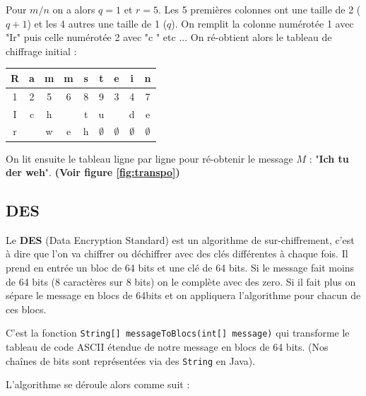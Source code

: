 \documentclass{article}
\begin{document}
\begin{itemize}
Pour $m/n$ on a alors $q=1$ et $r = 5$. Les 5 premières colonnes ont une taille de 2 ($q+1$) et les 4 autres une taille de 1 ($q$). On remplit la colonne numérotée 1 avec "Ir" puis celle numérotée 2 avec "c " etc ...  On ré-obtient alors le tableau de chiffrage initial :
\vspace{1\baselineskip}

\begin{center}
\begin{tabular}{|c|c|c|c|c|c|c|c|c|}
\hline
R & a & m & m & s & t & e & i & n\\
\hline
1 & 2 & 5 & 6 & 8 & 9 & 3 & 4 & 7\\
\hline
I & c & h &  & t & u &  & d & e\\
\hline
r &  & w & e & h & $\emptyset$ & $\emptyset$ & $\emptyset$ & $\emptyset$\\
\hline
\end{tabular}
\end{center}
\vspace{1\baselineskip}

On lit ensuite le tableau ligne par ligne pour ré-obtenir le message $M$ : "\textbf{Ich tu der weh}". \textbf{(Voir figure \ref{fig:transpo})}



\end{itemize}

\subsection{DES}

Le \textbf{DES} (Data Encryption Standard) est un algorithme de sur-chiffrement, c'est à dire que l'on va chiffrer ou déchiffrer avec des clés différentes à chaque fois. Il prend en entrée un bloc de 64 bits et une clé de 64 bits. Si le message fait moins de 64 bits (8 caractères sur 8 bits) on le complète avec des zero. Si il fait plus on sépare le message en blocs de 64bits et on appliquera l'algorithme pour chacun de ces blocs. 

C'est la fonction \verb+String[] messageToBlocs(int[] message)+ qui transforme le tableau de code ASCII étendue de notre message en blocs de 64 bits. (Nos chaînes de bits sont représentées via des \verb+String+ en Java). 

L'algorithme se déroule alors comme suit : 
\end{document}
